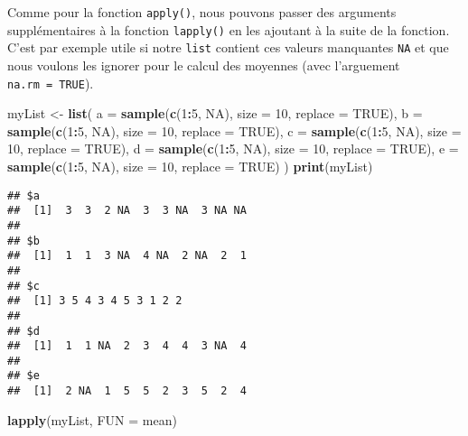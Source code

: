 \documentclass[]{book}
\newenvironment{Shaded}{\begin{snugshade}}{\end{snugshade}}
\newcommand{\KeywordTok}[1]{\textcolor[rgb]{0.13,0.29,0.53}{\textbf{#1}}}
\newcommand{\DataTypeTok}[1]{\textcolor[rgb]{0.13,0.29,0.53}{#1}}
\newcommand{\DecValTok}[1]{\textcolor[rgb]{0.00,0.00,0.81}{#1}}
\newcommand{\StringTok}[1]{\textcolor[rgb]{0.31,0.60,0.02}{#1}}
\newcommand{\OtherTok}[1]{\textcolor[rgb]{0.56,0.35,0.01}{#1}}
\newcommand{\OperatorTok}[1]{\textcolor[rgb]{0.81,0.36,0.00}{\textbf{#1}}}
\newcommand{\NormalTok}[1]{#1}
\theoremstyle{definition}
\theoremstyle{definition}
\theoremstyle{definition}
\theoremstyle{remark}
\begin{document}
Comme pour la fonction \texttt{apply()}, nous pouvons passer des
arguments supplémentaires à la fonction \texttt{lapply()} en les
ajoutant à la suite de la fonction. C'est par exemple utile si notre
\texttt{list} contient ces valeurs manquantes \texttt{NA} et que nous
voulons les ignorer pour le calcul des moyennes (avec l'arguement
\texttt{na.rm\ =\ TRUE}).

\begin{Shaded}
\begin{Highlighting}[]
\NormalTok{myList <-}\StringTok{ }\KeywordTok{list}\NormalTok{(}
  \DataTypeTok{a =} \KeywordTok{sample}\NormalTok{(}\KeywordTok{c}\NormalTok{(}\DecValTok{1}\OperatorTok{:}\DecValTok{5}\NormalTok{, }\OtherTok{NA}\NormalTok{), }\DataTypeTok{size =} \DecValTok{10}\NormalTok{, }\DataTypeTok{replace =} \OtherTok{TRUE}\NormalTok{), }
  \DataTypeTok{b =} \KeywordTok{sample}\NormalTok{(}\KeywordTok{c}\NormalTok{(}\DecValTok{1}\OperatorTok{:}\DecValTok{5}\NormalTok{, }\OtherTok{NA}\NormalTok{), }\DataTypeTok{size =} \DecValTok{10}\NormalTok{, }\DataTypeTok{replace =} \OtherTok{TRUE}\NormalTok{), }
  \DataTypeTok{c =} \KeywordTok{sample}\NormalTok{(}\KeywordTok{c}\NormalTok{(}\DecValTok{1}\OperatorTok{:}\DecValTok{5}\NormalTok{, }\OtherTok{NA}\NormalTok{), }\DataTypeTok{size =} \DecValTok{10}\NormalTok{, }\DataTypeTok{replace =} \OtherTok{TRUE}\NormalTok{), }
  \DataTypeTok{d =} \KeywordTok{sample}\NormalTok{(}\KeywordTok{c}\NormalTok{(}\DecValTok{1}\OperatorTok{:}\DecValTok{5}\NormalTok{, }\OtherTok{NA}\NormalTok{), }\DataTypeTok{size =} \DecValTok{10}\NormalTok{, }\DataTypeTok{replace =} \OtherTok{TRUE}\NormalTok{), }
  \DataTypeTok{e =} \KeywordTok{sample}\NormalTok{(}\KeywordTok{c}\NormalTok{(}\DecValTok{1}\OperatorTok{:}\DecValTok{5}\NormalTok{, }\OtherTok{NA}\NormalTok{), }\DataTypeTok{size =} \DecValTok{10}\NormalTok{, }\DataTypeTok{replace =} \OtherTok{TRUE}\NormalTok{)}
\NormalTok{)}
\KeywordTok{print}\NormalTok{(myList)}
\end{Highlighting}
\end{Shaded}

\begin{verbatim}
## $a
##  [1]  3  3  2 NA  3  3 NA  3 NA NA
## 
## $b
##  [1]  1  1  3 NA  4 NA  2 NA  2  1
## 
## $c
##  [1] 3 5 4 3 4 5 3 1 2 2
## 
## $d
##  [1]  1  1 NA  2  3  4  4  3 NA  4
## 
## $e
##  [1]  2 NA  1  5  5  2  3  5  2  4
\end{verbatim}

\begin{Shaded}
\begin{Highlighting}[]
\KeywordTok{lapply}\NormalTok{(myList, }\DataTypeTok{FUN =}\NormalTok{ mean)}
\end{Highlighting}
\end{Shaded}
\end{document}

